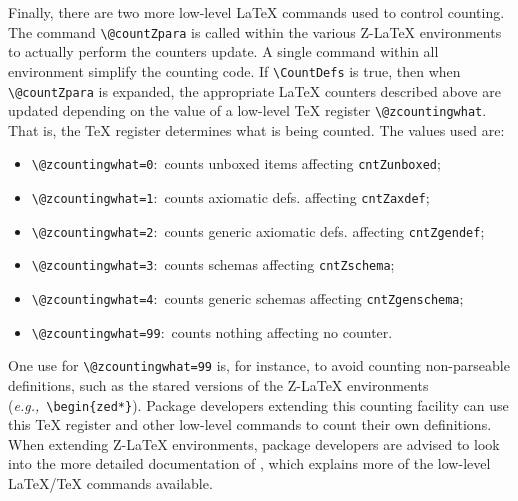 \documentclass{article}
\begin{document}
Finally, there are two more low-level \LaTeX{} commands used to control counting. The
command \verb|\@countZpara| is called within the various Z-\LaTeX{} environments to
actually perform the counters update. A single command within all environment simplify
the counting code. If \verb|\CountDefs| is true, then when \verb|\@countZpara| is expanded,
the appropriate \LaTeX{} counters described above are updated depending on the value of a
low-level \TeX{} register \verb|\@zcountingwhat|. That is, the \TeX{} register determines
what is being counted. The values used are:
%
\begin{itemize}
   \item \verb|\@zcountingwhat=0|:~counts unboxed items affecting \texttt{cntZunboxed};
   \item \verb|\@zcountingwhat=1|:~counts axiomatic defs. affecting \texttt{cntZaxdef};
   \item \verb|\@zcountingwhat=2|:~counts generic axiomatic defs. affecting \texttt{cntZgendef};
   \item \verb|\@zcountingwhat=3|:~counts schemas affecting \texttt{cntZschema};
   \item \verb|\@zcountingwhat=4|:~counts generic schemas affecting \texttt{cntZgenschema};
   \item \verb|\@zcountingwhat=99|:~counts nothing affecting no counter.
\end{itemize}
%
One use for \verb|\@zcountingwhat=99| is, for instance, to avoid counting non-parseable
definitions, such as the stared versions of the Z-\LaTeX{} environments (\textit{e.g.,}~\verb|\begin{zed*}|).
Package developers extending this counting facility can use this \TeX{} register and
other low-level commands to count their own definitions. When extending Z-\LaTeX{} environments,
package developers are advised to look into the more detailed documentation of \cztstylefile,
which explains more of the low-level \LaTeX/\TeX{} commands available.
\end{document}
